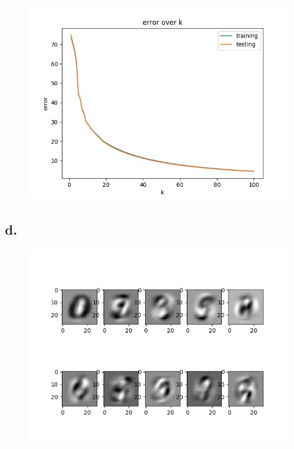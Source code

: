 \documentclass{article}
\newcommand{\1}{\mathbf{1}}
\begin{document}
{\begin{figure}[h]
  \centering
  \includegraphics[width=130mm]{../hw4-code/results/a3_cerr.png}
\end{figure}

\newpage

\subsection*{d.}


\begin{figure}[!hb]
  \centering
  \includegraphics[width=130mm]{../hw4-code/results/a3_d.png}
\end{figure}

}
\end{document}
